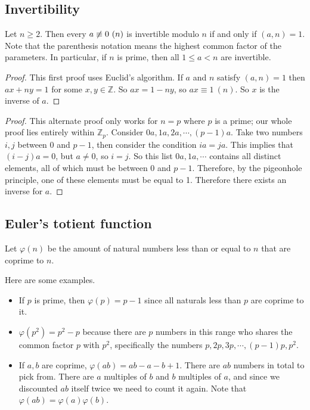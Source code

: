 \subsection{Invertibility}
\begin{proposition}
	Let \(n \geq 2\).
	Then every \(a \centernot\equiv 0\ (n)\) is invertible modulo \(n\) if and only if \((a, n) = 1\).
	Note that the parenthesis notation means the highest common factor of the parameters.
	In particular, if \(n\) is prime, then all \(1 \leq a < n\) are invertible.
\end{proposition}
\begin{proof}
	This first proof uses Euclid's algorithm.
	If \(a\) and \(n\) satisfy \((a, n) = 1\) then \(ax + ny = 1\) for some \(x, y \in \mathbb Z\).
	So \(ax = 1 - ny\), so \(ax \equiv 1\ (n)\).
	So \(x\) is the inverse of \(a\).
\end{proof}
\begin{proof}
	This alternate proof only works for \(n=p\) where \(p\) is a prime; our whole proof lies entirely within \(\mathbb Z_p\).
	Consider \(0a, 1a, 2a, \cdots, (p-1)a\).
	Take two numbers \(i, j\) between 0 and \(p-1\), then consider the condition \(ia = ja\).
	This implies that \((i - j)a = 0\), but \(a \neq 0\), so \(i=j\).
	So this list \(0a, 1a, \cdots\) contains all distinct elements, all of which must be between 0 and \(p-1\).
	Therefore, by the pigeonhole principle, one of these elements must be equal to 1.
	Therefore there exists an inverse for \(a\).
\end{proof}

\subsection{Euler's totient function}
\begin{definition}
	Let \(\varphi(n)\) be the amount of natural numbers less than or equal to \(n\) that are coprime to \(n\).
\end{definition}
Here are some examples.
\begin{itemize}
	\item If \(p\) is prime, then \(\varphi(p) = p - 1\) since all naturals less than \(p\) are coprime to it.
	\item \(\varphi(p^2) = p^2 - p\) because there are \(p\) numbers in this range who shares the common factor \(p\) with \(p^2\), specifically the numbers \(p, 2p, 3p, \cdots, (p-1)p, p^2\).
	\item If \(a, b\) are coprime, \(\varphi(ab) = ab - a - b + 1\).
	      There are \(ab\) numbers in total to pick from.
	      There are \(a\) multiples of \(b\) and \(b\) multiples of \(a\), and since we discounted \(ab\) itself twice we need to count it again.
	      Note that \(\varphi(ab) = \varphi(a)\varphi(b)\).
\end{itemize}

